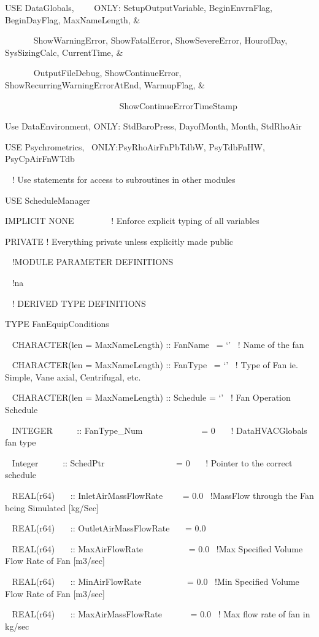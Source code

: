 USE DataGlobals,~~~~ ONLY: SetupOutputVariable, BeginEnvrnFlag, BeginDayFlag, MaxNameLength, \&

~~~~~~ ShowWarningError, ShowFatalError, ShowSevereError, HourofDay, SysSizingCalc, CurrentTime, \&

~~~~~~ OutputFileDebug, ShowContinueError, ShowRecurringWarningErrorAtEnd, WarmupFlag, \&

~ ~~~~~~~~~~~~~~~~~~~~~~~~~ShowContinueErrorTimeStamp

Use DataEnvironment, ONLY: StdBaroPress, DayofMonth, Month, StdRhoAir

USE Psychrometrics,~ ONLY:PsyRhoAirFnPbTdbW, PsyTdbFnHW, PsyCpAirFnWTdb

~ ! Use statements for access to subroutines in other modules

USE ScheduleManager

IMPLICIT NONE~~~~~~~~ ! Enforce explicit typing of all variables

PRIVATE ! Everything private unless explicitly made public

~ !MODULE PARAMETER DEFINITIONS

~ !na

~ ! DERIVED TYPE DEFINITIONS

TYPE FanEquipConditions

~ CHARACTER(len = MaxNameLength) :: FanName~ = `'~ ! Name of the fan

~ CHARACTER(len = MaxNameLength) :: FanType~ = `'~ ! Type of Fan ie. Simple, Vane axial, Centrifugal, etc.

~ CHARACTER(len = MaxNameLength) :: Schedule = `'~ ! Fan Operation Schedule

~ INTEGER ~~~~~:: FanType\_Num~~~~~~~~~~~~~ = 0~~~ ! DataHVACGlobals fan type

~ Integer~~~~~ :: SchedPtr~~~~~~~~~~~~~~~~ = 0~~~ ! Pointer to the correct schedule

~ REAL(r64)~~~ :: InletAirMassFlowRate~~~~ = 0.0~ !MassFlow through the Fan being Simulated {[}kg/Sec{]}

~ REAL(r64)~~~ :: OutletAirMassFlowRate~~~ = 0.0

~ REAL(r64)~~~ :: MaxAirFlowRate~~~~~~~~~~ = 0.0~ !Max Specified Volume Flow Rate of Fan {[}m3/sec{]}

~ REAL(r64)~~~ :: MinAirFlowRate~~~~~~~~~~ = 0.0~ !Min Specified Volume Flow Rate of Fan {[}m3/sec{]}

~ REAL(r64)~~~ :: MaxAirMassFlowRate~~~~~~ = 0.0~ ! Max flow rate of fan in kg/sec

